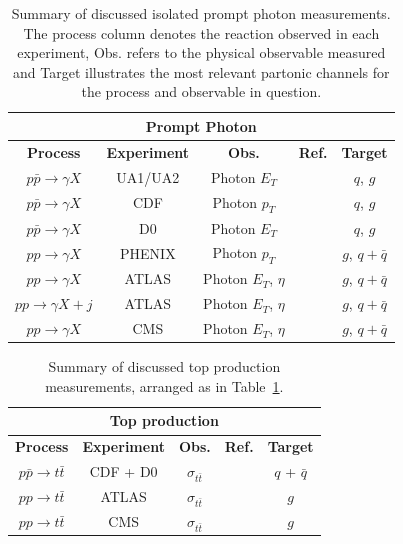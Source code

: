 \documentclass[12pt,twoside,openright]{report}
\begin{document}
\begin{spacing}{1.5}
\begin{table}[h]
\begin{center}
\begin{tabular}{|c|c|c|c|c|}
\hline
\multicolumn{5}{|c|}{\textbf{Prompt Photon}}\\
\hline
\textbf{Process} & \textbf{Experiment} & \textbf{Obs.} &\textbf{Ref.} &  \textbf{Target} \\
\hline\hline
$p\bar{p} \to \gamma X$ & UA1/UA2 & Photon $E_T$ &\cite{Albajar:1988im,Alitti:1992hn,Ansari:1988te} &$q$, $g$ \\
$p\bar{p} \to \gamma X$ & CDF & Photon $p_T$ &\cite{Aaltonen:2009ty,Abazov:2005wc,Abe:1994rra,Acosta:2002ya,Acosta:2004bg}& $q$, $g$\\
$p\bar{p} \to \gamma X$ & D0 & Photon $E_T$ &\cite{Abachi:1996qz,Abazov:2001af,Abbott:1999kd}& $q$, $g$\\
\hline
$pp \to \gamma X$ & PHENIX & Photon $p_T$ &\cite{Adler:2006yt} & $g$, $q+\bar{q}$ \\
\hline\hline
$pp \to \gamma X$ & ATLAS & Photon $E_T$, $\eta$ &\cite{Aad:2011tw} & $g$, $q+\bar{q}$  \\
$pp \to \gamma X + j$ & ATLAS & Photon $E_T$, $\eta$ &\cite{Aad:2011tw} & $g$, $q + \bar{q}$ \\
\hline
$pp \to \gamma X$ & CMS & Photon $E_T$, $\eta$ &\cite{Chatrchyan:2011ue} & $g$, $q + \bar{q}$ \\
\hline
\end{tabular}
\end{center}
\caption{Summary of discussed isolated prompt photon measurements. The process column denotes the reaction observed in each experiment, Obs. refers to the physical observable measured and Target illustrates the most relevant partonic channels for the process and observable in question.}
\label{tab:pp_summary}
\end{table}%

\begin{table}[h]
\begin{center}
\begin{tabular}{|c|c|c|c|c|}
\hline
\multicolumn{5}{|c|}{\textbf{Top production}}\\
\hline
\textbf{Process} & \textbf{Experiment} & \textbf{Obs.} &\textbf{Ref.} &  \textbf{Target} \\
\hline\hline
$p\bar{p} \to t\bar{t}$ & CDF + D0 & $\sigma_{t\bar{t}}$&\cite{Aaltonen:2012ttbar} & $q$ + $\bar{q}$ \\
\hline\hline
$pp \to t\bar{t}$ & ATLAS & $\sigma_{t\bar{t}}$&\cite{ATLAS:2012jyc,ATLAS:2012fja} & $g$ \\
$pp \to t\bar{t}$ & CMS & $\sigma_{t\bar{t}}$&\cite{Chatrchyan:2012bra,CMS:2012iba} & $g$ \\
\hline
\end{tabular}
\end{center}
\caption{Summary of discussed top production measurements, arranged as in Table~\ref{tab:pp_summary}.}
\label{tab:ttbar_summary}
\end{table}%




\end{spacing}
\end{document}
